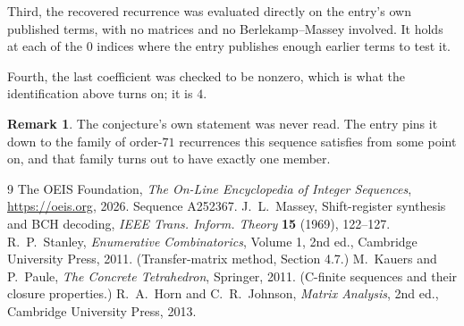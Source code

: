 \documentclass[11pt,a4paper]{article}
\theoremstyle{plain}
\theoremstyle{definition}
\newtheorem{remark}[theorem]{Remark}
\begin{document}
Third, the recovered recurrence was evaluated directly on the entry's own published terms, with
no matrices and no Berlekamp--Massey involved. It holds at each of the $0$ indices where
the entry publishes enough earlier terms to test it.

Fourth, the last coefficient was checked to be nonzero, which is what the identification above
turns on; it is $4$.

\begin{remark}
The conjecture's own statement was never read. The entry pins it down to the family of
order-$71$ recurrences this sequence satisfies from some point on, and that family turns
out to have exactly one member.
\end{remark}

\begin{thebibliography}{9}
 The OEIS Foundation, \emph{The On-Line Encyclopedia of Integer
Sequences}, \url{https://oeis.org}, 2026. Sequence A252367.
 J.~L.~Massey, Shift-register synthesis and BCH decoding, \emph{IEEE
Trans. Inform. Theory} \textbf{15} (1969), 122--127.
 R.~P.~Stanley, \emph{Enumerative Combinatorics}, Volume 1, 2nd ed.,
Cambridge University Press, 2011. (Transfer-matrix method, Section 4.7.)
 M.~Kauers and P.~Paule, \emph{The Concrete Tetrahedron}, Springer, 2011.
(C-finite sequences and their closure properties.)
 R.~A.~Horn and C.~R.~Johnson, \emph{Matrix Analysis}, 2nd ed., Cambridge
University Press, 2013.
\end{thebibliography}
\end{document}
